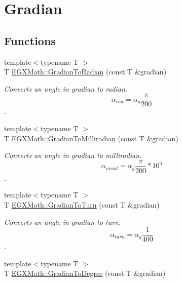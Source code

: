 \hypertarget{group___e_g_x_math-_conversions-_angle_conversions-_gradian}{}\section{Gradian}
\label{group___e_g_x_math-_conversions-_angle_conversions-_gradian}
\subsection*{Functions}
\begin{DoxyCompactItemize}
\item 
{\footnotesize template$<$typename T $>$ }\\T \mbox{\hyperlink{group___e_g_x_math-_conversions-_angle_conversions-_gradian_ga7ea0a6f47a672715b960181606c8fd7b}{E\+G\+X\+Math\+::\+Gradian\+To\+Radian}} (const T \&gradian)
\begin{DoxyCompactList}\small\item\em Converts an angle in gradian to radian. \[\alpha_{rad}=\alpha_{g}\frac{\pi}{200}\]. \end{DoxyCompactList}\item 
{\footnotesize template$<$typename T $>$ }\\T \mbox{\hyperlink{group___e_g_x_math-_conversions-_angle_conversions-_gradian_ga144f1019dc760268a163d81fcb3ce482}{E\+G\+X\+Math\+::\+Gradian\+To\+Milliradian}} (const T \&gradian)
\begin{DoxyCompactList}\small\item\em Converts an angle in gradian to milliradian. \[\alpha_{mrad}=\alpha_{g}\frac{\pi}{200}*10^3\]. \end{DoxyCompactList}\item 
{\footnotesize template$<$typename T $>$ }\\T \mbox{\hyperlink{group___e_g_x_math-_conversions-_angle_conversions-_gradian_ga11b42138910d26474f47c0a2043911c9}{E\+G\+X\+Math\+::\+Gradian\+To\+Turn}} (const T \&gradian)
\begin{DoxyCompactList}\small\item\em Converts an angle in gradian to turn. \[\alpha_{turn}=\alpha_{g}\frac{1}{400}\]. \end{DoxyCompactList}\item 
{\footnotesize template$<$typename T $>$ }\\T \mbox{\hyperlink{group___e_g_x_math-_conversions-_angle_conversions-_gradian_gaa284952274f16d225951cf5139d0ff4e}{E\+G\+X\+Math\+::\+Gradian\+To\+Degree}} (const T \&gradian)

\end{DoxyCompactItemize}
